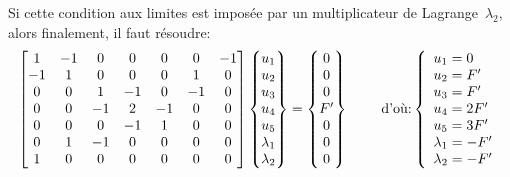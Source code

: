 Si cette condition aux limites est imposée par un multiplicateur de Lagrange~$\lambda_2$, alors finalement, il faut résoudre:
\begin{equation}
\MM*{1&-1&0&0&0&0&-1 \\ -1&1&0&0&0&1&0 \\ 0&0&1&-1&0&-1&0\\ 
0&0&-1&2&-1&0&0\\ 0&0&0&-1&1&0&0 \\ 0&1&-1&0&0&0&0 \\ 1&0&0&0&0&0&0}
\VV*{u_1\\u_2\\u_3\\u_4\\ u_5\\ \lambda_1 \\ \lambda_2}
=
\VV*{0\\0\\0\\F' \\ 0 \\ 0 \\ 0}
\qquad \text{ d'où:} 
\left\{\begin{array}{l} u_1=0 \\ u_2=F' \\ u_3=F' \\ u_4=2F' \\ u_5=3F' \\ \lambda_1 = -F' \\ \lambda_2 = -F' \end{array}\right.
\end{equation}